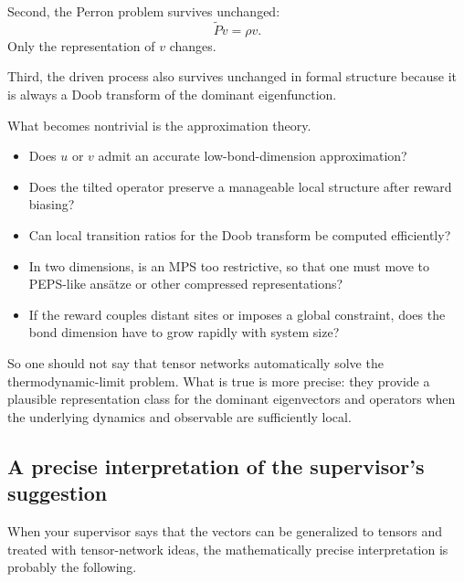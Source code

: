 \documentclass[11pt]{article}
\begin{document}
Second, the Perron problem survives unchanged:
\begin{equation}
    \widetilde P v = \rho v.
\end{equation}
Only the representation of \(v\) changes.

Third, the driven process also survives unchanged in formal structure because it is always a
Doob transform of the dominant eigenfunction.

What becomes nontrivial is the approximation theory.

\begin{itemize}
    \item Does \(u\) or \(v\) admit an accurate low-bond-dimension approximation?
    \item Does the tilted operator preserve a manageable local structure after reward biasing?
    \item Can local transition ratios for the Doob transform be computed efficiently?
    \item In two dimensions, is an MPS too restrictive, so that one must move to PEPS-like
    ans\"atze or other compressed representations?
    \item If the reward couples distant sites or imposes a global constraint, does the bond
    dimension have to grow rapidly with system size?
\end{itemize}

So one should not say that tensor networks automatically solve the thermodynamic-limit problem.
What is true is more precise: they provide a plausible representation class for the dominant
eigenvectors and operators when the underlying dynamics and observable are sufficiently local.

\subsection*{A precise interpretation of the supervisor's suggestion}

When your supervisor says that the vectors can be generalized to tensors and treated with
tensor-network ideas, the mathematically precise interpretation is probably the following.
\end{document}
